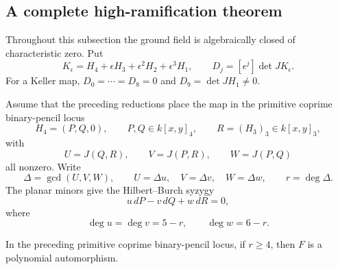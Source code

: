 \subsection{A complete high-ramification theorem}
\label{subsec:complete-high-ramification}

Throughout this subsection the ground field is algebraically closed of
characteristic zero.  Put
\[
 K_\epsilon=H_4+\epsilon H_3+\epsilon^2H_2+\epsilon^3H_1,
 \qquad
 D_j=[\epsilon^j]\det JK_\epsilon .
\]
For a Keller map, \(D_0=\cdots=D_8=0\) and
\(D_9=\det JH_1\ne0\).

Assume that the preceding reductions place the map in the primitive
coprime binary-pencil locus
\[
 H_4=(P,Q,0),\qquad P,Q\in k[x,y]_4,
 \qquad R=(H_3)_3\in k[x,y]_3,
\]
with
\[
 U=J(Q,R),\qquad V=J(P,R),\qquad W=J(P,Q)
\]
all nonzero.  Write
\[
 \Delta=\gcd(U,V,W),\qquad
 U=\Delta u,\quad V=\Delta v,\quad W=\Delta w,
 \qquad r=\deg\Delta.
\]
The planar minors give the Hilbert--Burch syzygy
\begin{equation}
 u\,dP-v\,dQ+w\,dR=0,
 \label{eq:r4-hb-syzygy}
\end{equation}
where
\[
 \deg u=\deg v=5-r,
 \qquad
 \deg w=6-r.
\]

\begin{theorem}
\label{thm:complete-binary-high-ramification}
In the preceding primitive coprime binary-pencil locus, if
\(r\ge4\), then \(F\) is a polynomial automorphism.
\end{theorem}

